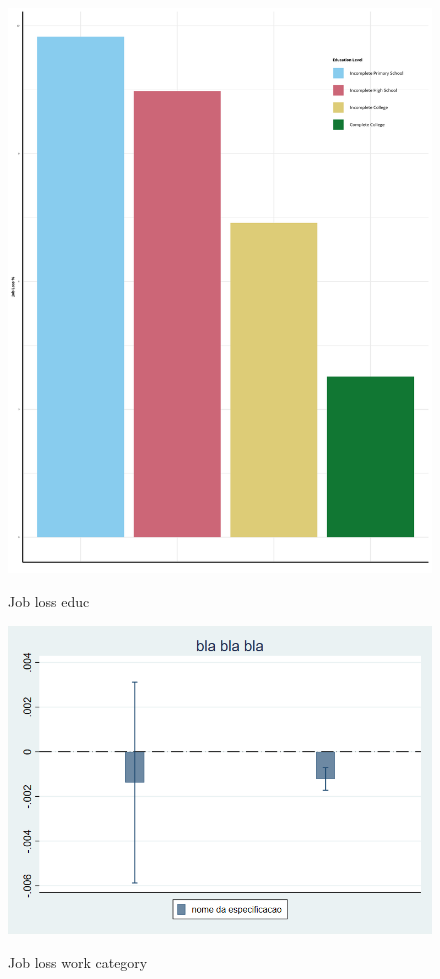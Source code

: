 \documentclass[a4paper]{article}
\begin{document}
\begin{figure}[hb]
  \centering
  \caption{Job loss educ}
  \includegraphics[width=0.85\linewidth]{../analysis/output/graph/_graph_job_loss_educ.png}
  \label{fig:_graph_job_loss_educ}
\end{figure}



\begin{figure}[hb]
  \centering
  \caption{Job loss work category}
  \includegraphics[width=0.85\linewidth]{../analysis/output/graph/_graph_regression_job_loss_determinants.png}
  \label{fig:_graph_regression_job_loss_determinants}
\end{figure}
\end{document}
